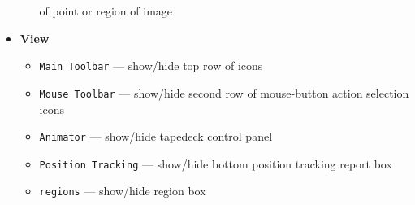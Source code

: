 \begin{itemize}
\begin{itemize}
                 of point or region of image
  \end{itemize}
\item {\bf View}
  \begin{itemize}
      \item {\tt Main Toolbar} --- show/hide top row of icons
      \item {\tt Mouse Toolbar} --- show/hide second row of
                 mouse-button action selection icons
      \item {\tt Animator} --- show/hide tapedeck control panel
      \item {\tt Position Tracking} --- show/hide bottom position
                 tracking report box  
      \item {\tt regions} --- show/hide region box  
  \end{itemize}
\end{itemize}

